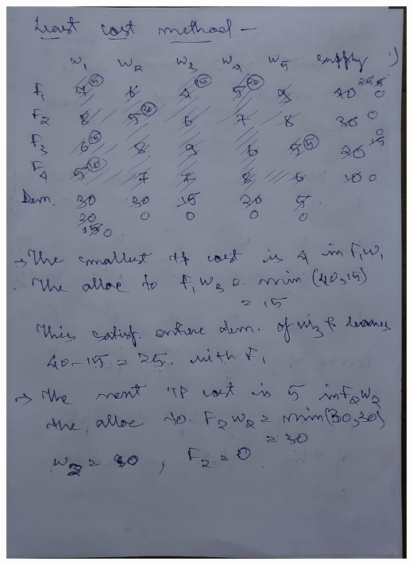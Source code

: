 \documentclass[12pt, letterpaper, twoside]{book}
\begin{document}
\includegraphics[width=\paperwidth, height=\paperheight]{Page20}
\end{document}
